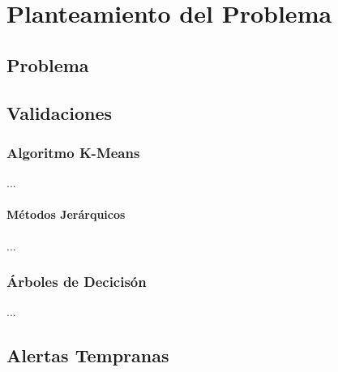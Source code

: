\chapter{Planteamiento del Problema}
\label{chap:planteamientoproblema}

\section{Problema}


\section{Validaciones}
\subsection{Algoritmo K-Means}

...

\subsubsection{Métodos Jerárquicos}

...


\subsection{Árboles de Decicisón}

...


\section{Alertas Tempranas}